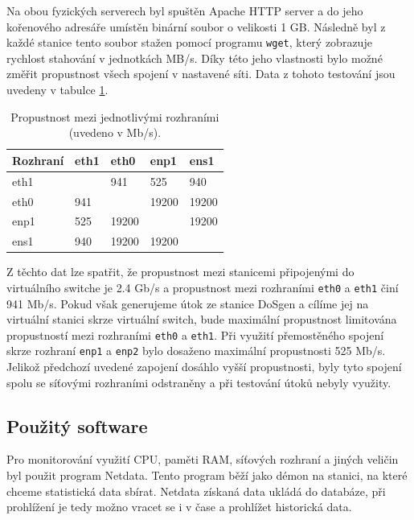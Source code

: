 Na obou fyzických serverech byl spuštěn Apache HTTP server a do jeho kořenového adresáře umístěn binární soubor o velikosti 1 GB. Následně byl z každé stanice tento soubor stažen pomocí programu \texttt{wget}, který zobrazuje rychlost stahování v jednotkách MB/s. Díky této jeho vlastnosti bylo možné změřit propustnost všech spojení v nastavené síti. Data z tohoto testování jsou uvedeny v tabulce \ref{tab:troughput-lab-interfaces}.

\begin{table}[ht]
	\centering
	\caption{Propustnost mezi jednotlivými rozhraními (uvedeno v Mb/s).}
	\label{tab:troughput-lab-interfaces}
	\begin{tabular}{|l|l|l|l|l|}
		\hline
		Rozhraní & eth1 & eth0  & enp1  & ens1  \\ \hline
		eth1     &      & 941   & 525   & 940   \\ \hline
		eth0     & 941  &       & 19200 & 19200 \\ \hline
		enp1     & 525  & 19200 &       & 19200 \\ \hline
		ens1     & 940  & 19200 & 19200 &       \\ \hline
	\end{tabular}
\end{table}

Z těchto dat lze spatřit, že propustnost mezi stanicemi připojenými do virtuálního switche je 2.4 Gb/s a propustnost mezi rozhraními \texttt{eth0} a \texttt{eth1} činí 941 Mb/s. Pokud však generujeme útok ze stanice DoSgen a cílíme jej na virtuální stanici skrze virtuální switch, bude maximální propustnost limitována propustností mezi rozhraními \texttt{eth0} a \texttt{eth1}.
Při využití přemostěného spojení skrze rozhraní \texttt{enp1} a \texttt{enp2} bylo dosaženo maximální propustnosti 525 Mb/s. Jelikož předchozí uvedené zapojení dosáhlo vyšší propustnosti, byly tyto spojení spolu se síťovými rozhraními odstraněny a při testování útoků nebyly využity.



\subsection{Použitý software} %
Pro monitorování využití CPU, paměti RAM, síťových rozhraní a jiných veličin byl použit program Netdata. Tento program běží jako démon na stanici, na které chceme statistická data sbírat. Netdata získaná data ukládá do databáze, při prohlížení je tedy možno vracet se i v čase a prohlížet historická data.

